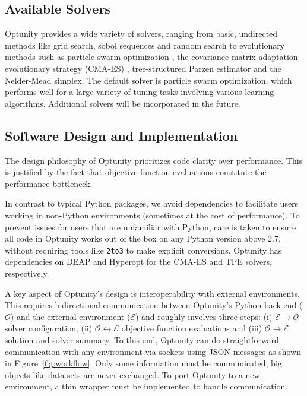 \documentclass[twoside,11pt]{article}
\newcommand{\optunity}{{\sc Optunity}\xspace}
\begin{document}
\subsection{Available Solvers}
\optunity provides a wide variety of solvers, ranging from basic, undirected methods like grid search, sobol sequences and random search \citep{bergstra2012random} to evolutionary methods such as particle swarm optimization \citep{kennedy2010particle}, the covariance matrix adaptation evolutionary strategy (CMA-ES) \citep{hansen2001completely}, tree-structured Parzen estimator \citep{bergstra2011algorithms} and the Nelder-Mead simplex. The default solver is particle swarm optimization, which performs well for a large variety of tuning tasks involving various learning algorithms. Additional solvers will be incorporated in the future.
 
\subsection{Software Design and Implementation}

The design philosophy of \optunity prioritizes code clarity over performance. This is justified by the fact that objective function evaluations constitute the performance bottleneck. 

In contrast to typical Python packages, we avoid dependencies to facilitate users working in non-Python environments (sometimes at the cost of performance). To prevent issues for users that are unfamiliar with Python, care is taken to ensure all code in \optunity works out of the box on any Python version above 2.7, without requiring tools like \texttt{2to3} to make explicit conversions. \optunity has dependencies on {\sc DEAP} \citep{fortin2012deap} and {\sc Hyperopt} \citep{bergstra2013hyperopt} for the CMA-ES and TPE solvers, respectively. 

A key aspect of \optunity's design is interoperability with external environments. This requires bidirectional communication between \optunity's Python back-end ($\mathcal{O}$) and the external environment ($\mathcal{E}$) and roughly involves three steps: (i) $\mathcal{E}\rightarrow\mathcal{O}$ solver configuration, (ii) $\mathcal{O}\leftrightarrow\mathcal{E}$ objective function evaluations and (iii) $\mathcal{O}\rightarrow\mathcal{E}$ solution and solver summary. To this end, \optunity can do straightforward communication with any environment via sockets using JSON messages as shown in Figure~\ref{fig:workflow}. Only some information must be communicated, big objects like data sets are never exchanged. To port \optunity to a new environment, a thin wrapper must be implemented to handle communication.
\end{document}

